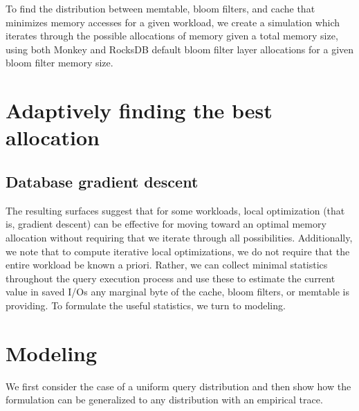 \documentclass{sig-alternate-05-2015}
\begin{document}
To find the distribution between memtable, bloom filters, and cache that minimizes memory accesses for a given workload, we create a simulation which iterates through the possible allocations of memory given a total memory size, using both Monkey and RocksDB default bloom filter layer allocations for a given bloom filter memory size. 

\section{Adaptively finding the best allocation}

\subsection{Database gradient descent}



The resulting surfaces suggest that for some workloads, local optimization (that is, gradient descent) can be effective for moving toward an optimal memory allocation without requiring that we iterate through all possibilities. Additionally, we note that to compute iterative local optimizations, we do not require that the entire workload be known a priori. Rather, we can collect minimal statistics throughout the query execution process and use these to estimate the current value in saved I/Os any marginal byte of the cache, bloom filters, or memtable is providing. To formulate the useful statistics, we turn to modeling.

%

\section{Modeling}

We first consider the case of a uniform query distribution and then show how the formulation can be generalized to any distribution with an empirical trace.
\end{document}

